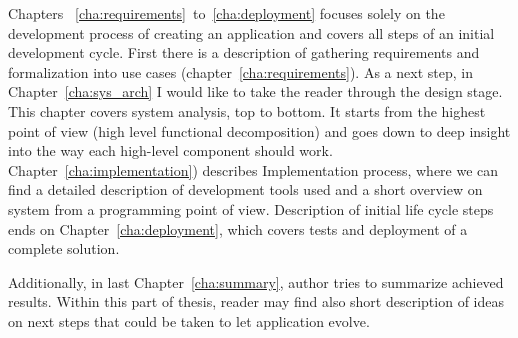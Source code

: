 Chapters ~\ref{cha:requirements}~to~\ref{cha:deployment} focuses solely on the development process of creating an application and covers all steps of an initial development cycle. First there is a description of gathering requirements and formalization into use cases (chapter~\ref{cha:requirements}). As a next step, in Chapter~\ref{cha:sys_arch} I would like to take the reader through the design stage. This chapter covers system analysis, top to bottom. It starts from the highest point of view (high level functional decomposition) and goes down to deep insight into the way each high-level component should work. Chapter~\ref{cha:implementation}) describes Implementation process, where we can find a detailed description of development tools used and a short overview on system from a programming point of view. Description of initial life cycle steps ends on Chapter~\ref{cha:deployment}, which covers tests and deployment of a complete solution.

Additionally, in last Chapter~\ref{cha:summary}, author tries to summarize achieved results. Within this part of thesis, reader may find also short description of ideas on next steps that could be taken to let application evolve.
